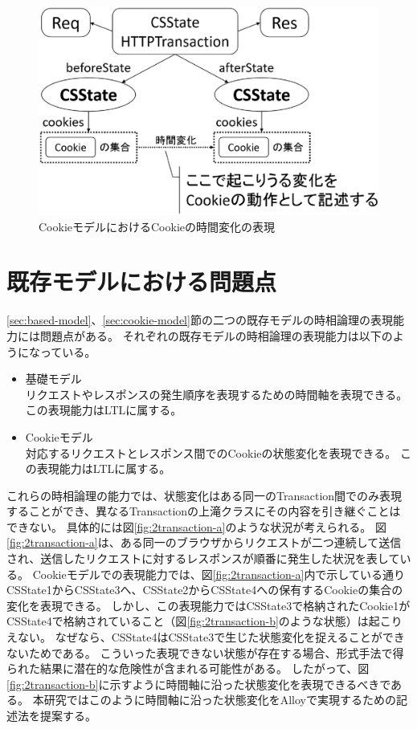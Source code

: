\documentclass[12pt,a4paper]{jbook}
\begin{document}
\begin{figure}[htb]
\centering
\includegraphics[width=350pt]{./fig/cookie-model-transaction.eps}
\caption{CookieモデルにおけるCookieの時間変化の表現}
\label{fig:cookie-model-transaction}
\end{figure}

\section{既存モデルにおける問題点}
\label{sec:existing-models-problems}
\ref{sec:based-model}、\ref{sec:cookie-model}節の二つの既存モデルの時相論理の表現能力には問題点がある。
それぞれの既存モデルの時相論理の表現能力は以下のようになっている。
\begin{itemize}
\item 基礎モデル \\
リクエストやレスポンスの発生順序を表現するための時間軸を表現できる。
この表現能力はLTLに属する。
\item Cookieモデル \\
対応するリクエストとレスポンス間でのCookieの状態変化を表現できる。
この表現能力はLTLに属する。
\end{itemize}
これらの時相論理の能力では、状態変化はある同一のTransaction間でのみ表現することができ、異なるTransactionの上滝クラスにその内容を引き継ぐことはできない。
具体的には図\ref{fig:2transaction-a}のような状況が考えられる。
図\ref{fig:2transaction-a}は、ある同一のブラウザからリクエストが二つ連続して送信され、送信したリクエストに対するレスポンスが順番に発生した状況を表している。
Cookieモデルでの表現能力では、図\ref{fig:2transaction-a}内で示している通りCSState1からCSState3へ、CSState2からCSState4への保有するCookieの集合の変化を表現できる。
しかし、この表現能力ではCSState3で格納されたCookie1がCSState4で格納されていること（図\ref{fig:2transaction-b}のような状態）は起こりえない。
なぜなら、CSState4はCSState3で生じた状態変化を捉えることができないためである。
こういった表現できない状態が存在する場合、形式手法で得られた結果に潜在的な危険性が含まれる可能性がある。
したがって、図\ref{fig:2transaction-b}に示すように時間軸に沿った状態変化を表現できるべきである。
本研究ではこのように時間軸に沿った状態変化をAlloyで実現するための記述法を提案する。
\end{document}
